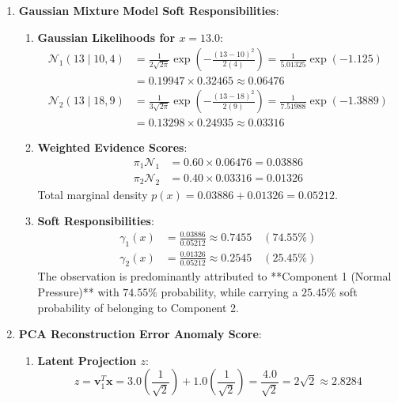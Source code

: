 \begin{enumerate}
    \item \textbf{Gaussian Mixture Model Soft Responsibilities}:
    \begin{enumerate}[label=(\alph*)]
        \item \textbf{Gaussian Likelihoods for $x = 13.0$}:
        \begin{align*}
        \mathcal{N}_1(13 \mid 10, 4) &= \frac{1}{2\sqrt{2\pi}} \exp\left( -\frac{(13 - 10)^2}{2(4)} \right) = \frac{1}{5.01325} \exp(-1.125) \\
        &= 0.19947 \times 0.32465 \approx \mathbf{0.06476} \\
        \mathcal{N}_2(13 \mid 18, 9) &= \frac{1}{3\sqrt{2\pi}} \exp\left( -\frac{(13 - 18)^2}{2(9)} \right) = \frac{1}{7.51988} \exp(-1.3889) \\
        &= 0.13298 \times 0.24935 \approx \mathbf{0.03316}
        \end{align*}

        \item \textbf{Weighted Evidence Scores}:
        \begin{align*}
        \pi_1 \mathcal{N}_1 &= 0.60 \times 0.06476 = \mathbf{0.03886} \\
        \pi_2 \mathcal{N}_2 &= 0.40 \times 0.03316 = \mathbf{0.01326}
        \end{align*}
        Total marginal density $p(x) = 0.03886 + 0.01326 = 0.05212$.

        \item \textbf{Soft Responsibilities}:
        \begin{align*}
        \gamma_1(x) &= \frac{0.03886}{0.05212} \approx \mathbf{0.7455} \quad (\mathbf{74.55\%}) \\
        \gamma_2(x) &= \frac{0.01326}{0.05212} \approx \mathbf{0.2545} \quad (\mathbf{25.45\%})
        \end{align*}
        The observation is predominantly attributed to **Component 1 (Normal Pressure)** with $74.55\%$ probability, while carrying a $25.45\%$ soft probability of belonging to Component 2.
    \end{enumerate}

    \item \textbf{PCA Reconstruction Error Anomaly Score}:
    \begin{enumerate}[label=(\alph*)]
        \item \textbf{Latent Projection $z$}:
        \begin{equation*}
        z = \mathbf{v}_1^T \mathbf{x} = 3.0\left(\frac{1}{\sqrt{2}}\right) + 1.0\left(\frac{1}{\sqrt{2}}\right) = \frac{4.0}{\sqrt{2}} = 2\sqrt{2} \approx \mathbf{2.8284}
        \end{equation*}


\end{enumerate}
\end{enumerate}
